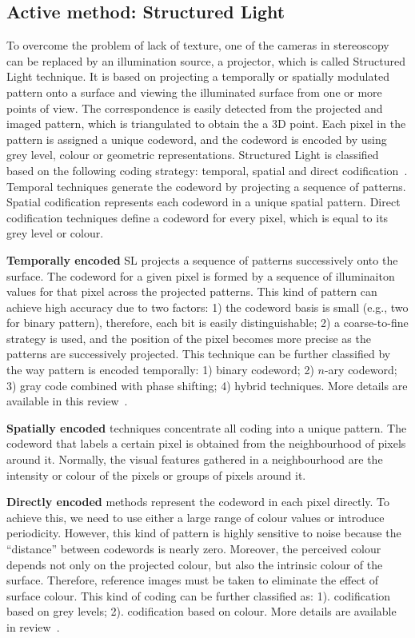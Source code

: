 \subsection{Active method: Structured Light}
To overcome the problem of lack of texture, one of the cameras in stereoscopy can be replaced by an illumination source, \eg a projector, which is called Structured Light technique. It is based on projecting a temporally or spatially modulated pattern onto a surface and viewing the illuminated surface from one or more points of view. The correspondence is easily detected from the projected and imaged pattern, which is triangulated to obtain the a 3D point. Each pixel in the pattern is assigned a unique codeword, and the codeword is encoded by using grey level, colour or geometric representations. Structured Light is classified based on the following coding strategy: temporal, spatial and direct codification~\cite{salvi2004pattern}. Temporal techniques generate the codeword by projecting a sequence of patterns. Spatial codification represents each codeword in a unique spatial pattern. Direct codification techniques define a codeword for every pixel, which is equal to its grey level or colour.

\textbf{Temporally encoded} SL projects a sequence of patterns successively onto the surface. The codeword for a given pixel is formed by a sequence of illuminaiton values for that pixel across the projected patterns. This kind of pattern can achieve high accuracy due to two factors: 1) the codeword basis is small (e.g., two for binary pattern), therefore, each bit is easily distinguishable; 2) a coarse-to-fine strategy is used, and the position of the pixel becomes more precise as the patterns are successively projected. This technique can be further classified by the way pattern is encoded temporally: 1) binary codeword; 2) $n$-ary codeword; 3) gray code combined with phase shifting; 4) hybrid techniques. More details are available in this review~\cite{salvi2004pattern}.

\textbf{Spatially encoded} techniques concentrate all coding into a unique pattern. The codeword that labels a certain pixel is obtained from the neighbourhood of pixels around it. Normally, the visual features gathered in a neighbourhood are the intensity or colour of the pixels or groups of pixels around it.

\textbf{Directly encoded} methods represent the codeword in each pixel directly. To achieve this, we need to use either a large range of colour values or introduce periodicity. However, this kind of pattern is highly sensitive to noise because the ``distance'' between codewords is nearly zero. Moreover, the perceived colour depends not only on the projected colour, but also the intrinsic colour of the surface. Therefore, reference images must be taken to eliminate the effect of surface colour. This kind of coding can be further classified as: 1). codification based on grey levels; 2). codification based on colour. More details are available in review~\cite{salvi2004pattern}.

